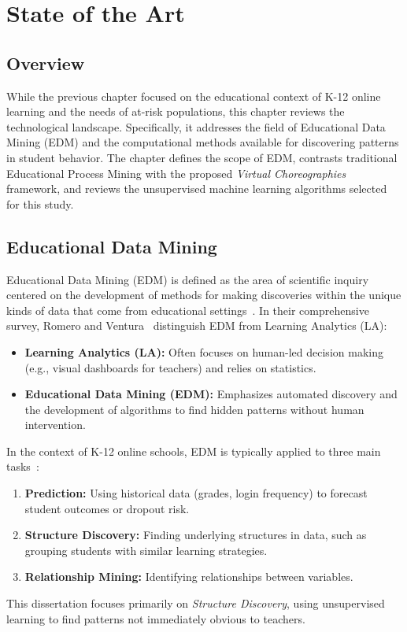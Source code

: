 \chapter{State of the Art}
\label{chap:stateofart}


\section{Overview}
While the previous chapter focused on the educational context of K-12 online learning and the needs of at-risk populations, this chapter reviews the technological landscape.
Specifically, it addresses the field of Educational Data Mining (EDM) and the computational methods available for discovering patterns in student behavior.
The chapter defines the scope of EDM, contrasts traditional Educational Process Mining with the proposed \textit{Virtual Choreographies} framework, and reviews the unsupervised machine learning algorithms selected for this study.

\section{Educational Data Mining}
\label{sec:edm}
Educational Data Mining (EDM) is defined as the area of scientific inquiry centered on the development of methods for making discoveries within the unique kinds of data that come from educational settings~\cite{romero_edm_survey}.
In their comprehensive survey, Romero and Ventura~\cite{romero_edm_survey} distinguish EDM from Learning Analytics (LA):
\begin{itemize}
    \item \textbf{Learning Analytics (LA):} Often focuses on human-led decision making (e.g., visual dashboards for teachers) and relies on statistics.
    \item \textbf{Educational Data Mining (EDM):} Emphasizes automated discovery and the development of algorithms to find hidden patterns without human intervention.
\end{itemize}

In the context of K-12 online schools, EDM is typically applied to three main tasks~\cite{romero_edm_survey}:
\begin{enumerate}
    \item \textbf{Prediction:} Using historical data (grades, login frequency) to forecast student outcomes or dropout risk.
    \item \textbf{Structure Discovery:} Finding underlying structures in data, such as grouping students with similar learning strategies.
    \item \textbf{Relationship Mining:} Identifying relationships between variables.
\end{enumerate}
This dissertation focuses primarily on \textit{Structure Discovery}, using unsupervised learning to find patterns not immediately obvious to teachers.

